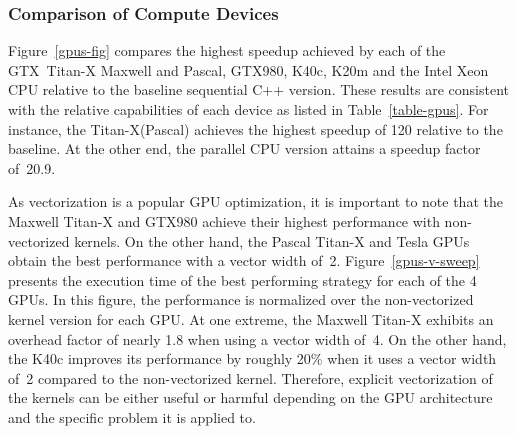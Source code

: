 \subsubsection{Comparison of Compute Devices}
Figure~\ref{gpus-fig} compares the highest speedup achieved by each of the
GTX~\mbox{Titan-X} Maxwell and Pascal, GTX980, K40c, K20m and the Intel Xeon CPU relative to the baseline
sequential C++ version. These results are consistent with the relative
capabilities of each device as listed in Table~\ref{table-gpus}. For instance,
the \mbox{Titan-X(Pascal)} achieves the highest speedup of 120 relative to the baseline. At the
other end, the parallel CPU version attains a speedup factor of~20.9.

As vectorization is a popular GPU optimization, it is important to note that
the Maxwell \mbox{Titan-X} and GTX980 achieve their highest performance with non-vectorized kernels.
On the other hand, the Pascal \mbox{Titan-X} and Tesla GPUs obtain the best performance with a vector
width of~2. Figure~\ref{gpus-v-sweep} presents the execution time of the best
performing strategy for each of the 4 GPUs. In this figure, the performance is
normalized over the non-vectorized kernel version for each GPU. At one extreme,
the Maxwell \mbox{Titan-X} exhibits an overhead factor of nearly 1.8 when using a vector
width of~4. On the other hand, the K40c improves its performance by roughly
20\% when it uses a vector width of~2 compared to the non-vectorized kernel.
Therefore, explicit vectorization of the kernels can be either useful or
harmful depending on the GPU architecture and the specific problem it is
applied to.



